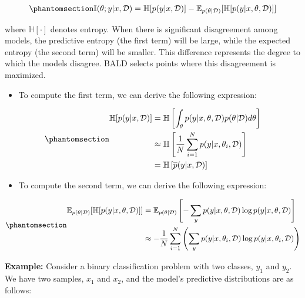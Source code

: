 \documentclass[
  letterpaper,
  numbers=noenddot,
  DIV=11]{scrreprt}
\providecommand{\tightlist}{%
  \setlength{\itemsep}{0pt}\setlength{\parskip}{0pt}}\usepackage{longtable,booktabs,array}
\theoremstyle{plain}
\theoremstyle{definition}
\theoremstyle{plain}
\theoremstyle{remark}
\begin{document}
\begin{equation}\phantomsection\label{eq-eq3.2}{
\mathbb{I}(\theta; y|x, \mathcal{D}) = \mathbb{H}[p(y|x, \mathcal{D})] - \mathbb{E}_{p(\theta | \mathcal{D})} [\mathbb{H}[p(y|x, \theta, \mathcal{D})]]
}\end{equation}

where \(\mathbb{H}[\cdot]\) denotes entropy. When there is significant
disagreement among models, the predictive entropy (the first term) will
be large, while the expected entropy (the second term) will be smaller.
This difference represents the degree to which the models disagree. BALD
selects points where this disagreement is maximized.

\begin{itemize}
\tightlist
\item
  To compute the first term, we can derive the following expression:
\end{itemize}

\begin{equation}\phantomsection\label{eq-eq3.3}{\begin{aligned}
\mathbb{H}[p(y|x, \mathcal{D})] &= \mathbb{H}\left[\int_{\theta} p(y|x, \theta, \mathcal{D}) p(\theta | \mathcal{D}) d\theta\right]\\
&\approx \mathbb{H}\left[\frac{1}{N}\sum_{i=1}^{N} p(y|x, \theta_i, \mathcal{D})\right]\\
&= \mathbb{H}\left[\overline{p}(y|x, \mathcal{D})\right]
\end{aligned}}\end{equation}

\begin{itemize}
\tightlist
\item
  To compute the second term, we can derive the following expression:
\end{itemize}

\begin{equation}\phantomsection\label{eq-eq3.4}{\begin{aligned}
\mathbb{E}_{p(\theta|\mathcal{D})} [\mathbb{H}[p(y|x, \theta, \mathcal{D})]] &= \mathbb{E}_{p(\theta|\mathcal{D})} \left[ - \sum_{y} p(y|x, \theta, \mathcal{D}) \log p(y|x, \theta, \mathcal{D}) \right] \\
&\approx - \frac{1}{N} \sum_{i=1}^{N} \left( \sum_{y} p(y|x, \theta_i, \mathcal{D}) \log p(y|x, \theta_i, \mathcal{D}) \right)
\end{aligned}}\end{equation}

\textbf{Example:} Consider a binary classification problem with two
classes, \(y_1\) and \(y_2\). We have two samples, \(x_1\) and \(x_2\),
and the model's predictive distributions are as follows:
\end{document}
